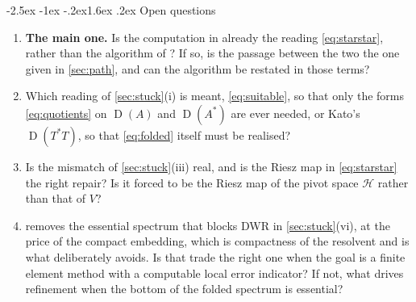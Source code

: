 \documentclass[11pt,a4paper]{article}
\makeatletter
\newcommand{\Hb}{\mathcal{H}}
\DeclareMathOperator{\dom}{D}
\renewcommand\section{\@startsection{section}{1}{\z@}%
  {-2.5ex \@plus -1ex \@minus -.2ex}{1.6ex \@plus.2ex}%
  {\normalfont\Large\bfseries}}
\makeatother
\begin{document}
\section{Open questions}
\label{sec:questions}

\begin{enumerate}\itemsep1pt
  \item \textbf{The main one.}  Is the computation in
        \cite[\S3.4.4]{Colbrook2026} already the reading \eqref{eq:starstar},
        rather than the algorithm of \cite[\S3.4.1]{Colbrook2026}?  If so, is the
        passage between the two the one given in \cref{sec:path}, and can the
        algorithm be restated in those terms?
  \item Which reading of \cref{sec:stuck}(i) is meant, \eqref{eq:suitable}, so
        that only the forms \eqref{eq:quotients} on $\dom(A)$ and $\dom(A^*)$ are
        ever needed, or Kato's $\dom(T^*T)$, so that \eqref{eq:folded} itself
        must be realised?
  \item Is the mismatch of \cref{sec:stuck}(iii) real, and is the Riesz map in
        \eqref{eq:starstar} the right repair?  Is it forced to be the Riesz map
        of the pivot space $\Hb$ rather than that of $V$?
  \item {} removes the essential spectrum that blocks DWR in
        \cref{sec:stuck}(vi), at the price of the compact embedding, which is
        compactness of the resolvent and is what \cite{Colbrook2026} deliberately
        avoids.  Is that trade the right one when the goal is a finite element
        method with a computable local error indicator?  If not, what drives
        refinement when the bottom of the folded spectrum is essential?
\end{enumerate}



\end{document}
